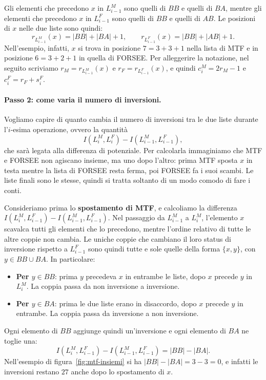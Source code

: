Gli elementi che precedono $x$ in $L^M_{i-1}$ sono quelli di $BB$ e quelli di $BA$, mentre gli elementi che precedono $x$ in $L^F_{i-1}$ sono quelli di $BB$ e quelli di $AB$. Le posizioni di $x$ nelle due liste sono quindi:
\begin{equation}\label{eq:mtf-posizioni}
r_{L^M_{i-1}}(x) = |BB| + |BA| + 1, \qquad r_{L^F_{i-1}}(x) = |BB| + |AB| + 1.
\end{equation}
Nell'esempio, infatti, $x$ si trova in posizione $7 = 3 + 3 + 1$ nella lista di MTF e in posizione $6 = 3 + 2 + 1$ in quella di FORSEE. Per alleggerire la notazione, nel seguito scriviamo $r_M = r_{L^M_{i-1}}(x)$ e $r_F = r_{L^F_{i-1}}(x)$, e quindi $c^M_i = 2r_M - 1$ e $c^F_i = r_F + s^F_i$.

\paragraph{Passo 2: come varia il numero di inversioni.}
Vogliamo capire di quanto cambia il numero di inversioni tra le due liste durante l'$i$-esima operazione, ovvero la quantità
\[
I(L^M_i, L^F_i) - I(L^M_{i-1}, L^F_{i-1}),
\]
che sarà legata alla differenza di potenziale. Per calcolarla immaginiamo che MTF e FORSEE non agiscano insieme, ma uno dopo l'altro: prima MTF sposta $x$ in testa mentre la lista di FORSEE resta ferma, poi FORSEE fa i suoi scambi. Le liste finali sono le stesse, quindi si tratta soltanto di un modo comodo di fare i conti.

Consideriamo prima lo \textbf{spostamento di MTF}, e calcoliamo la differenza $I(L^M_i, L^F_{i-1}) - I(L^M_{i-1}, L^F_{i-1})$. Nel passaggio da $L^M_{i-1}$ a $L^M_i$, l'elemento $x$ scavalca tutti gli elementi che lo precedono, mentre l'ordine relativo di tutte le altre coppie non cambia. Le uniche coppie che cambiano il loro status di inversione rispetto a $L^F_{i-1}$ sono quindi tutte e sole quelle della forma $\{x, y\}$, con $y \in BB \cup BA$. In particolare:
\begin{itemize}
    \item \textbf{Per $y \in BB$}: prima $y$ precedeva $x$ in entrambe le liste, dopo $x$ precede $y$ in $L^M_i$. La coppia passa da non inversione a inversione.
    \item \textbf{Per $y \in BA$}: prima le due liste erano in disaccordo, dopo $x$ precede $y$ in entrambe. La coppia passa da inversione a non inversione.
\end{itemize}
Ogni elemento di $BB$ aggiunge quindi un'inversione e ogni elemento di $BA$ ne toglie una:
\begin{equation}\label{eq:mtf-spostamento}
I(L^M_i, L^F_{i-1}) - I(L^M_{i-1}, L^F_{i-1}) = |BB| - |BA|.
\end{equation}
Nell'esempio di figura~\ref{fig:mtf-insiemi} si ha $|BB| - |BA| = 3 - 3 = 0$, e infatti le inversioni restano $27$ anche dopo lo spostamento di $x$.

